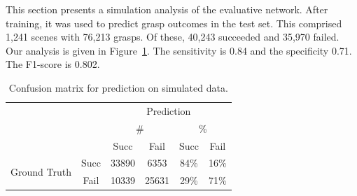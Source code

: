This section presents a simulation analysis of the evaluative network. After training, it was used to predict grasp outcomes in the test set. This comprised 1,241 scenes with 76,213 grasps. Of these, 40,243 succeeded and 35,970 failed. Our analysis is given in Figure~\ref{fig:predictions}. The sensitivity is 0.84 and the specificity 0.71. The F1-score is 0.802.
\begin{table}[b]
\centering
\caption{Confusion matrix for prediction on simulated data.}
\label{fig:predictions}
\begin{tabular}{|c|c|c|c|c|c|}
\hline
 & & \multicolumn{4}{c|}{Prediction} \\ \cline{3-6}
      & & \multicolumn{2}{c|}{\#} & \multicolumn{2}{c|}{\%} \\ \cline{3-6}
  &  & Succ         & Fail         & Succ         & Fail         \\ \hline
\multirow{ 2}{*}{Ground Truth} \newline & Succ & 33890      & 6353       & 84\%     & 16\%       \\ \cline{2-6}
 &Fail & 10339      &  25631    & 29\%     &  71\%   \\ \hline
\end{tabular}
\end{table}


